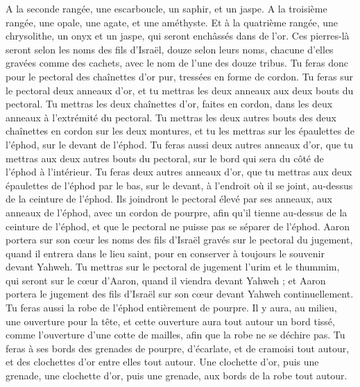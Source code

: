 \begin{multicols}{2}
A la seconde rangée, une escarboucle, un saphir, et un jaspe.
A la troisième rangée, une opale, une agate, et une améthyste.
Et à la quatrième rangée, une chrysolithe, un onyx et un jaspe, qui seront enchâssés dans de l'or.
Ces pierres-là seront selon les noms des fils d'Israël, douze selon leurs noms, chacune d'elles gravées comme des cachets, avec le nom de l’une des douze tribus.
Tu feras donc pour le pectoral des chaînettes d’or pur, tressées en forme de cordon.
Tu feras sur le pectoral deux anneaux d'or, et tu mettras les deux anneaux aux deux bouts du pectoral.
Tu mettras les deux chaînettes d'or, faites en cordon, dans les deux anneaux à l'extrémité du pectoral.
Tu mettras les deux autres bouts des deux chaînettes en cordon sur les deux montures, et tu les mettras sur les épaulettes de l'éphod, sur le devant de l'éphod.
Tu feras aussi deux autres anneaux d'or, que tu mettras aux deux autres bouts du pectoral, sur le bord qui sera du côté de l'éphod à l’intérieur.
Tu feras deux autres anneaux d'or, que tu mettras aux deux épaulettes de l'éphod par le bas, sur le devant, à l'endroit où il se joint, au-dessus de la ceinture de l'éphod.
Ils joindront le pectoral élevé par ses anneaux, aux anneaux de l'éphod, avec un cordon de pourpre, afin qu'il tienne au-dessus de la ceinture de l'éphod, et que le pectoral ne puisse pas se séparer de l'éphod.
Aaron portera sur son cœur les noms des fils d'Israël gravés sur le pectoral du jugement, quand il entrera dans le lieu saint, pour en conserver à toujours le souvenir devant Yahweh.
Tu mettras sur le pectoral de jugement l'urim et le thummim, qui seront sur le cœur d'Aaron, quand il viendra devant Yahweh ; et Aaron portera le jugement des fils d'Israël sur son cœur devant Yahweh continuellement.
Tu feras aussi la robe de l'éphod entièrement de pourpre.
Il y aura, au milieu, une ouverture pour la tête, et cette ouverture aura tout autour un bord tissé, comme l’ouverture d’une cotte de mailles, afin que la robe ne se déchire pas.
Tu feras à ses bords des grenades de pourpre, d'écarlate, et de cramoisi tout autour, et des clochettes d'or entre elles tout autour.
Une clochette d'or, puis une grenade, une clochette d'or, puis une grenade, aux bords de la robe tout autour.

\end{multicols}
